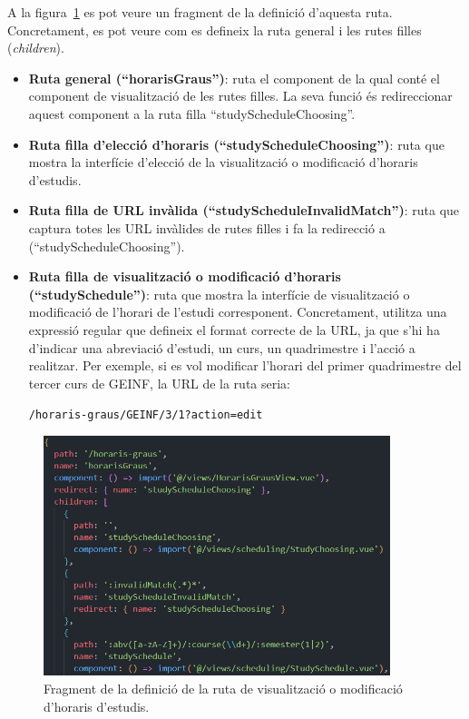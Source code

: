 \documentclass[a4paper,12pt]{ThesisStyle}
\begin{document}
A la figura~\ref{img:rutaHoraris} es pot veure un fragment de la definició d'aquesta ruta. Concretament, es pot veure com es defineix la ruta general i les rutes filles (\textit{children}).
\begin{itemize}
  \item \textbf{Ruta general (``horarisGraus'')}: ruta el component de la qual conté el component de visualització de les rutes filles. La seva funció és redireccionar aquest component a la ruta filla ``studyScheduleChoosing''.
  \item \textbf{Ruta filla d'elecció d'horaris (``studyScheduleChoosing'')}: ruta que mostra la interfície d'elecció de la visualització o modificació d'horaris d'estudis.
  \item \textbf{Ruta filla de URL invàlida (``studyScheduleInvalidMatch'')}: ruta que captura totes les URL invàlides de rutes filles i fa la redirecció a (``studyScheduleChoosing'').
  \item \textbf{Ruta filla de visualització o modificació d'horaris (``studySchedule'')}: ruta que mostra la interfície de visualització o modificació de l'horari de l'estudi corresponent. Concretament, utilitza una expressió regular que defineix el format correcte de la URL, ja que s'hi ha d'indicar una abreviació d'estudi, un curs, un quadrimestre i l'acció a realitzar. Per exemple, si es vol modificar l'horari del primer quadrimestre del tercer curs de GEINF, la URL de la ruta seria:\\[-0.6cm]
  \begin{center}
    \texttt{/horaris-graus/GEINF/3/1?action=edit}
  \end{center}
\end{itemize}

\newpage

\begin{figure}[H]
  \centering
  \includegraphics[width=0.9\textwidth]{assets/code/enrutamentClient/rutaHoraris.png}
  \caption{\label{img:rutaHoraris} Fragment de la definició de la ruta de visualització o modificació d'horaris d'estudis.}
\end{figure}
\end{document}
